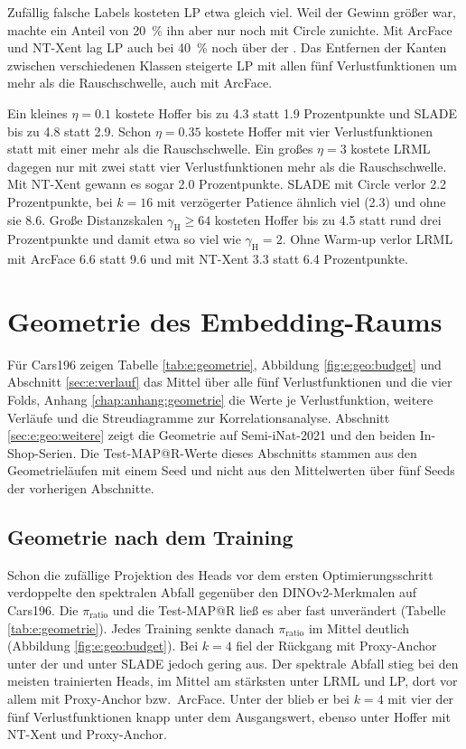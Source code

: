 Zufällig falsche Labels kosteten \ac{LP} etwa gleich viel. Weil der Gewinn größer war, machte ein Anteil von \qty{20}{\percent} ihn aber nur noch mit Circle zunichte. Mit ArcFace und \ac{NT-Xent} lag \ac{LP} auch bei \qty{40}{\percent} noch über der \UEBL. Das Entfernen der Kanten zwischen verschiedenen Klassen steigerte \ac{LP} mit allen fünf Verlustfunktionen um mehr als die Rauschschwelle, auch mit ArcFace.

Ein kleines $\eta=\num{0.1}$ kostete Hoffer bis zu \num{4.3} statt \num{1.9} Prozentpunkte und \ac{SLADE} bis zu \num{4.8} statt \num{2.9}. Schon $\eta=\num{0.35}$ kostete Hoffer mit vier Verlustfunktionen statt mit einer mehr als die Rauschschwelle. Ein großes $\eta=3$ kostete \ac{LRML} dagegen nur mit zwei statt vier Verlustfunktionen mehr als die Rauschschwelle. Mit \ac{NT-Xent} gewann es sogar \num{2.0} Prozentpunkte. \ac{SLADE} mit Circle verlor \num{2.2} Prozentpunkte, bei $k=16$ mit verzögerter Patience ähnlich viel (\num{2.3}) und ohne sie \num{8.6}. Große Distanzskalen $\gamma_{\mathrm{H}}\ge64$ kosteten Hoffer bis zu \num{4.5} statt rund drei Prozentpunkte und damit etwa so viel wie $\gamma_{\mathrm{H}}=2$. Ohne Warm-up verlor \ac{LRML} mit ArcFace \num{6.6} statt \num{9.6} und mit \ac{NT-Xent} \num{3.3} statt \num{6.4} Prozentpunkte.

\section{Geometrie des Embedding-Raums}
\label{sec:e:geometrie}
Für Cars196 zeigen Tabelle \ref{tab:e:geometrie}, Abbildung \ref{fig:e:geo:budget} und Abschnitt \ref{sec:e:verlauf} das Mittel über alle fünf Verlustfunktionen und die vier Folds, Anhang \ref{chap:anhang:geometrie} die Werte je Verlustfunktion, weitere Verläufe und die Streudiagramme zur Korrelationsanalyse. Abschnitt \ref{sec:e:geo:weitere} zeigt die Geometrie auf Semi-iNat-2021 und den beiden In-Shop-Serien. Die Test-\ac{MAP@R}-Werte dieses Abschnitts stammen aus den Geometrieläufen mit einem Seed und nicht aus den Mittelwerten über fünf Seeds der vorherigen Abschnitte.

\subsection{Geometrie nach dem Training}


Schon die zufällige Projektion des Heads vor dem ersten Optimierungsschritt verdoppelte den spektralen Abfall gegenüber den DINOv2-Merkmalen auf Cars196. Die $\pi_{\mathrm{ratio}}$ und die Test-\ac{MAP@R} ließ es aber fast unverändert (Tabelle \ref{tab:e:geometrie}). Jedes Training senkte danach $\pi_{\mathrm{ratio}}$ im Mittel deutlich (Abbildung \ref{fig:e:geo:budget}). Bei $k=4$ fiel der Rückgang mit Proxy-Anchor unter der \UEBL und unter \ac{SLADE} jedoch gering aus. Der spektrale Abfall stieg bei den meisten trainierten Heads, im Mittel am stärksten unter \ac{LRML} und \ac{LP}, dort vor allem mit Proxy-Anchor bzw.\ ArcFace. Unter der \UEBL blieb er bei $k=4$ mit vier der fünf Verlustfunktionen knapp unter dem Ausgangswert, ebenso unter Hoffer mit \ac{NT-Xent} und Proxy-Anchor.

